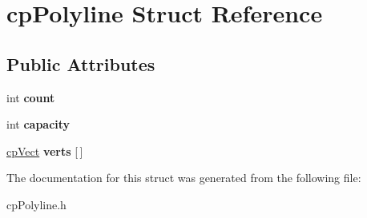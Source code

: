 \hypertarget{structcp_polyline}{}\section{cp\+Polyline Struct Reference}
\label{structcp_polyline}
\subsection*{Public Attributes}
\begin{DoxyCompactItemize}
\item 
\hypertarget{structcp_polyline_a15fab291947d004468393ad00d1cc37d}{}int {\bfseries count}\label{structcp_polyline_a15fab291947d004468393ad00d1cc37d}

\item 
\hypertarget{structcp_polyline_a982538e2e60e8eb6952b756c3940d15f}{}int {\bfseries capacity}\label{structcp_polyline_a982538e2e60e8eb6952b756c3940d15f}

\item 
\hypertarget{structcp_polyline_a9c89acf6a9f8fc1bcaeba5057cc468de}{}\hyperlink{structcp_vect}{cp\+Vect} {\bfseries verts} \mbox{[}$\,$\mbox{]}\label{structcp_polyline_a9c89acf6a9f8fc1bcaeba5057cc468de}

\end{DoxyCompactItemize}


The documentation for this struct was generated from the following file\+:\begin{DoxyCompactItemize}
\item 
cp\+Polyline.\+h\end{DoxyCompactItemize}
